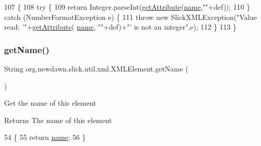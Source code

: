 \begin{DoxyCode}
107                                                                               \{
108         \textcolor{keywordflow}{try} \{
109             \textcolor{keywordflow}{return} Integer.parseInt(\mbox{\hyperlink{classorg_1_1newdawn_1_1slick_1_1util_1_1xml_1_1_x_m_l_element_a49543d209f2f2709c8e7a88fac034c69}{getAttribute}}(\mbox{\hyperlink{classorg_1_1newdawn_1_1slick_1_1util_1_1xml_1_1_x_m_l_element_aa96123a88e2614952c4d3d1a4207560a}{name}},\textcolor{stringliteral}{""}+def));
110         \} \textcolor{keywordflow}{catch} (NumberFormatException e) \{
111             \textcolor{keywordflow}{throw} \textcolor{keyword}{new} SlickXMLException(\textcolor{stringliteral}{"Value read: '"}+\mbox{\hyperlink{classorg_1_1newdawn_1_1slick_1_1util_1_1xml_1_1_x_m_l_element_a49543d209f2f2709c8e7a88fac034c69}{getAttribute}}(
      \mbox{\hyperlink{classorg_1_1newdawn_1_1slick_1_1util_1_1xml_1_1_x_m_l_element_aa96123a88e2614952c4d3d1a4207560a}{name}}, \textcolor{stringliteral}{""}+def)+\textcolor{stringliteral}{"' is not an integer"},e);
112         \}
113     \}
\end{DoxyCode}
\mbox{\label{classorg_1_1newdawn_1_1slick_1_1util_1_1xml_1_1_x_m_l_element_aae1473c007cf9349735fd0ed60ad7b3a}} 
\subsubsection{\texorpdfstring{get\+Name()}{getName()}}
{\footnotesize\ttfamily String org.\+newdawn.\+slick.\+util.\+xml.\+X\+M\+L\+Element.\+get\+Name (\begin{DoxyParamCaption}{ }\end{DoxyParamCaption})\hspace{0.3cm}{\ttfamily [inline]}}

Get the name of this element

\begin{DoxyReturn}{Returns}
The name of this element 
\end{DoxyReturn}

\begin{DoxyCode}
54                             \{
55         \textcolor{keywordflow}{return} \mbox{\hyperlink{classorg_1_1newdawn_1_1slick_1_1util_1_1xml_1_1_x_m_l_element_aa96123a88e2614952c4d3d1a4207560a}{name}};
56     \}
\end{DoxyCode}
\mbox{\label{classorg_1_1newdawn_1_1slick_1_1util_1_1xml_1_1_x_m_l_element_aa28c517a2c08f9c84057cf32fd864ed8}} 
